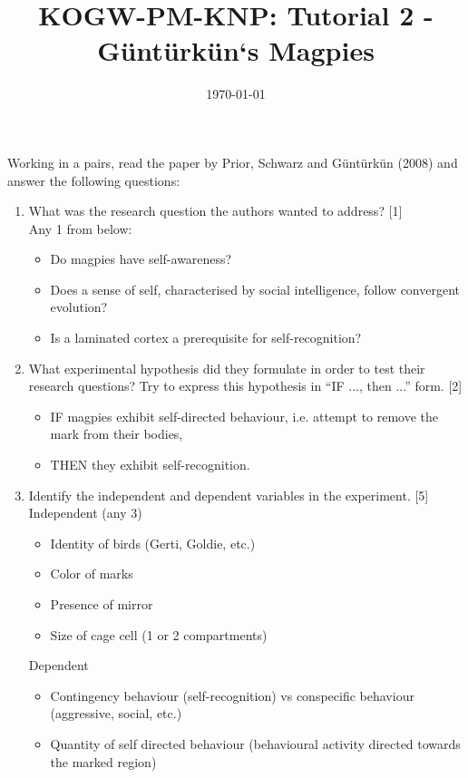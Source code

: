 \documentclass[12pt,english]{scrartcl}
\title{KOGW-PM-KNP: Tutorial 2 - G{\"u}nt{\"u}rk{\"u}n`s Magpies}
\author{}
\date{\today}
\begin{document}
\maketitle

Working in a pairs, read the paper by Prior, Schwarz and G{\"u}nt{\"u}rk{\"u}n (2008) and answer the following questions:
\begin{enumerate}
 \item What was the research question the authors wanted to address? [1] \\
 \color{blue}
 Any 1 from below:
 \begin{itemize}
 \item Do magpies have self-awareness?
 \item Does a sense of self, characterised by social intelligence, follow convergent
evolution?
 \item Is a laminated cortex a prerequisite for self-recognition?
 \end{itemize}
 
 \color{black}
 \item What experimental hypothesis did they formulate in order to test their research questions? Try to express this hypothesis in ``IF ..., then ...'' form. [2] \\
 \color{blue}
 \begin{itemize}
 \item IF magpies exhibit self-directed behaviour, i.e. attempt to remove the mark
from their bodies,
 \item THEN they exhibit self-recognition.
 \end{itemize}
 
 \color{black}
 \item Identify the independent and dependent variables in the experiment. [5]\\
 \color{blue}
 Independent (any 3)
 \begin{itemize}
  \item Identity of birds (Gerti, Goldie, etc.)
  \item Color of marks
  \item Presence of mirror
  \item Size of cage cell (1 or 2 compartments)
  \end{itemize}
 Dependent
 \begin{itemize}
 \item Contingency behaviour (self-recognition) vs conspecific behaviour (aggressive,
social, etc.)
 \item Quantity of self directed behaviour (behavioural activity directed towards the
marked region)
 \end{itemize}
 

\end{enumerate}
\end{document}
